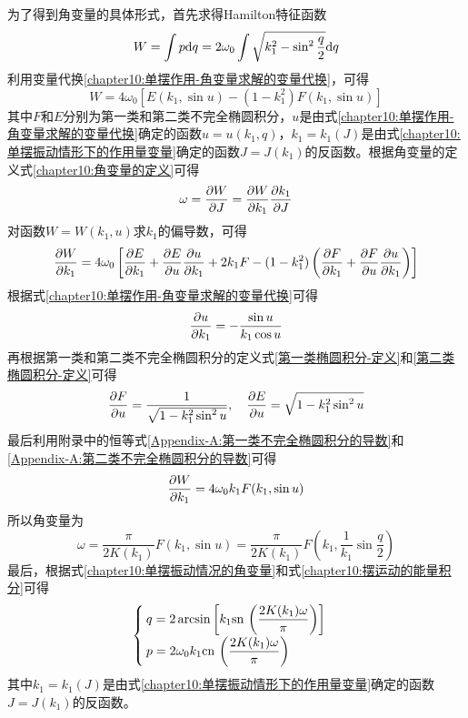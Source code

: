 为了得到角变量的具体形式，首先求得Hamilton特征函数
\begin{align}
	W = \int p\mathrm{d} q = 2\omega_0 \int \sqrt{k_1^2-\sin^2\frac q2}\mathrm{d} q
\end{align}
利用变量代换\eqref{chapter10:单摆作用-角变量求解的变量代换}，可得
\begin{equation}
	W = 4\omega_0\left[E(k_1,\sin u)-(1-k_1^2)F(k_1,\sin u)\right]
\end{equation}
其中$F$和$E$分别为第一类和第二类不完全椭圆积分，$u$是由式\eqref{chapter10:单摆作用-角变量求解的变量代换}确定的函数$u=u(k_1,q)$，$k_1=k_1(J)$是由式\eqref{chapter10:单摆振动情形下的作用量变量}确定的函数$J=J(k_1)$的反函数。根据角变量的定义式\eqref{chapter10:角变量的定义}可得
\begin{equation}
	\omega = \frac{\partial W}{\partial J} = \frac{\partial W}{\partial k_1} \frac{\partial k_1}{\partial J}
\end{equation}
对函数$W=W(k_1,u)$求$k_1$的偏导数，可得
\begin{equation}
	\frac{\partial W}{\partial k_1} = 4\omega_0\left[\frac{\partial E}{\partial k_1} + \frac{\partial E}{\partial u}\frac{\partial u}{\partial k_1} + 2k_1F - (1-k_1^2)\left(\frac{\partial F}{\partial k_1} + \frac{\partial F}{\partial u}\frac{\partial u}{\partial k_1}\right)\right]
\end{equation}
根据式\eqref{chapter10:单摆作用-角变量求解的变量代换}可得
\begin{equation}
	\frac{\partial u}{\partial k_1} = -\frac{\sin u}{k_1\cos u}
\end{equation}
再根据第一类和第二类不完全椭圆积分的定义式\eqref{第一类椭圆积分-定义}和\eqref{第二类椭圆积分-定义}可得
\begin{align}
	\frac{\partial F}{\partial u} = \frac{1}{\sqrt{1-k_1^2\sin^2u}},\quad \frac{\partial E}{\partial u} = \sqrt{1-k_1^2\sin^2u}
\end{align}
最后利用附录中的恒等式\eqref{Appendix-A:第一类不完全椭圆积分的导数}和\eqref{Appendix-A:第二类不完全椭圆积分的导数}可得
\begin{equation}
	\frac{\partial W}{\partial k_1} = 4\omega_0k_1F(k_1,\sin u)
\end{equation}
所以角变量为
\begin{equation}
	\omega = \frac{\pi}{2K(k_1)}F(k_1,\sin u) = \frac{\pi}{2K(k_1)}F\left(k_1,\frac{1}{k_1}\sin \frac q2\right)
	\label{chapter10:单摆振动情况的角变量}
\end{equation}
最后，根据式\eqref{chapter10:单摆振动情况的角变量}和式\eqref{chapter10:摆运动的能量积分}可得
\begin{equation}
\begin{cases}
	\displaystyle q = 2\arcsin\left[k_1\mathrm{sn}\, \left(\frac{2K(k_1)\omega}{\pi}\right)\right] \\[1.5ex]
	\displaystyle p = 2\omega_0k_1\mathrm{cn}\, \left(\frac{2K(k_1)\omega}{\pi}\right)
\end{cases}
\end{equation}
其中$k_1=k_1(J)$是由式\eqref{chapter10:单摆振动情形下的作用量变量}确定的函数$J=J(k_1)$的反函数。


